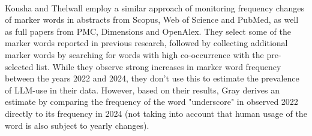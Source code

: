 \\
Kousha and Thelwall \cite{Kousha2025} employ a similar approach of monitoring frequency changes of marker words in abstracts from Scopus, Web of Science and PubMed, as well as full papers from PMC, Dimensions and OpenAlex.
They select some of the marker words reported in previous research, followed by collecting additional marker words by searching for words with high co-occurrence with the pre-selected list.
While they observe strong increases in marker word frequency between the years 2022 and 2024, they don't use this to estimate the prevalence of LLM-use in their data.
However, based on their results, Gray \cite{Gray2025} derives an estimate by comparing the frequency of the word "underscore" in observed 2022 directly to its frequency in 2024 (not taking into account that human usage of the word is also subject to yearly changes).

